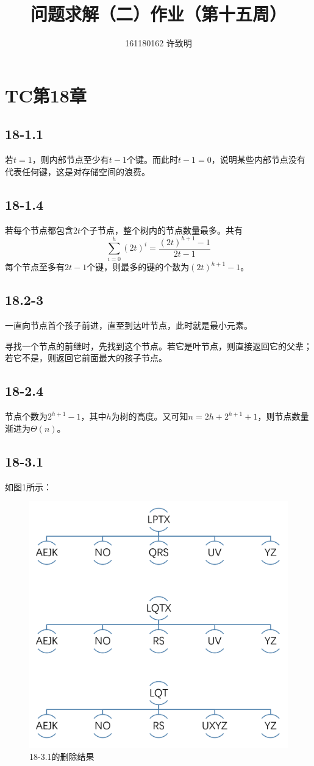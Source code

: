 \documentclass[twocolumn]{article}
\begin{document}
	\title{问题求解（二）作业（第十五周）}\author{161180162 许致明}\maketitle
	\section*{TC第18章}
	\subsection*{18-1.1}
	若$t=1$，则内部节点至少有$t-1$个键。而此时$t-1=0$，说明某些内部节点没有代表任何键，这是对存储空间的浪费。
	\subsection*{18-1.4}
	若每个节点都包含$2t$个子节点，整个树内的节点数量最多。共有$$\sum_{i=0}^{h}(2t)^i=\frac{(2t)^{h+1}-1}{2t-1}$$
	每个节点至多有$2t-1$个键，则最多的键的个数为$(2t)^{h+1}-1$。
	\subsection*{18.2-3}
	一直向节点首个孩子前进，直至到达叶节点，此时就是最小元素。\par
	寻找一个节点的前继时，先找到这个节点。若它是叶节点，则直接返回它的父辈；若它不是，则返回它前面最大的孩子节点。
	\subsection*{18-2.4}
	节点个数为$2^{h+1}-1$，其中$h$为树的高度。又可知$n=2h+2^{h+1}+1$，则节点数量渐进为$\Theta(n)$。
	\subsection*{18-3.1}
	如图1所示：
	\begin{figure}[H]
		\centering
		\includegraphics[width=1\linewidth]{14_1}
		\caption{18-3.1的删除结果}
	\end{figure}
\end{document}
